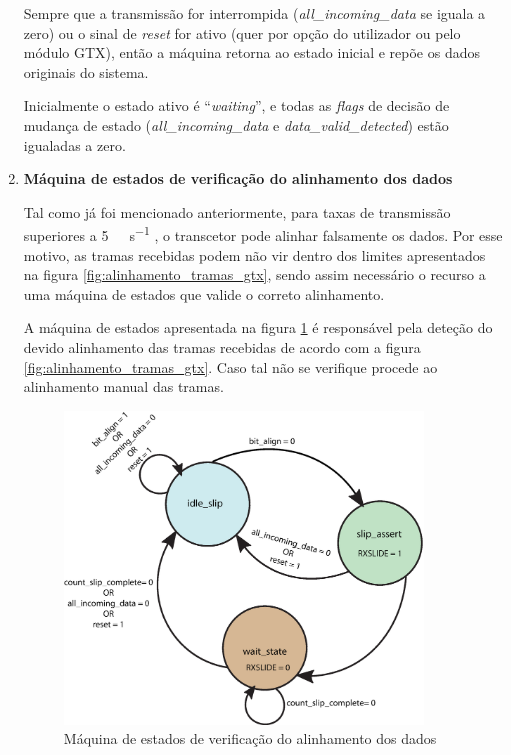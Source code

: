 \documentclass[11pt,a4paper]{article}
\begin{document}
\begin{enumerate}
		Sempre que a transmissão for interrompida (\textit{all\_incoming\_data} se iguala a zero) ou o sinal de \textit{reset} for ativo (quer por opção do utilizador ou pelo módulo GTX), então a máquina retorna ao estado inicial e repõe os dados originais do sistema. 
		
		Inicialmente o estado ativo é ``\textit{waiting}'', e todas as \textit{flags} de decisão de mudança de estado (\textit{all\_incoming\_data} e \textit{data\_valid\_detected}) estão igualadas a zero.
		
		
		\item \textbf{Máquina de estados de verificação do alinhamento dos dados}
		
		Tal como já foi mencionado anteriormente, para taxas de transmissão superiores a \SI{5}{\giga\bit\per\second} , o transcetor pode alinhar falsamente os dados. Por esse motivo, as tramas recebidas podem não vir dentro dos limites apresentados na figura \ref{fig:alinhamento_tramas_gtx}, sendo assim necessário o recurso a uma máquina de estados que valide o correto alinhamento.
		
		A máquina de estados apresentada na figura \ref{fig:fsm3} é responsável pela deteção do devido alinhamento das tramas recebidas de acordo com a figura \ref{fig:alinhamento_tramas_gtx}. Caso tal não se verifique procede ao alinhamento manual das tramas.
		
		\begin{figure}[h!]
			\begin{center}
				\leavevmode
				\includegraphics[width=0.9\textwidth]{fsm_bit_align}
				\caption[Máquina de estados de verificação do alinhamento dos dados]{Máquina de estados de verificação do alinhamento dos dados}
				\label{fig:fsm3}
			\end{center}
		\end{figure}
		

\end{enumerate}
\end{document}
